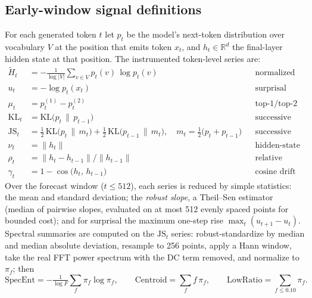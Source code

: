 
\subsection{Early-window signal definitions}\label{app:signals}

For each generated token $t$ let $p_t$ be the model's next-token
distribution over vocabulary $V$ at the position that emits token $x_t$,
and $h_t \in \mathbb{R}^d$ the final-layer hidden state at that position.
The instrumented token-level series are:
\begin{align*}
\tilde H_t &= -\frac{1}{\log \lvert V\rvert} \sum_{v \in V} p_t(v)\, \log p_t(v)
  && \text{normalized entropy}\\[3pt]
u_t &= -\log p_t(x_t)
  && \text{surprisal}\\[3pt]
\mu_t &= p_t^{(1)} - p_t^{(2)}
  && \text{top-1/top-2 probability margin}\\[3pt]
\mathrm{KL}_t &= \mathrm{KL}\bigl(p_t \,\big\|\, p_{t-1}\bigr)
  && \text{successive KL divergence}\\[3pt]
\mathrm{JS}_t &= \tfrac{1}{2}\,\mathrm{KL}\bigl(p_t \,\big\|\, m_t\bigr)
  + \tfrac{1}{2}\,\mathrm{KL}\bigl(p_{t-1} \,\big\|\, m_t\bigr),
  \quad m_t = \tfrac{1}{2}\bigl(p_t + p_{t-1}\bigr)
  && \text{successive JS divergence}\\[3pt]
\nu_t &= \lVert h_t \rVert
  && \text{hidden-state norm}\\[3pt]
\rho_t &= \lVert h_t - h_{t-1} \rVert \big/ \lVert h_{t-1} \rVert
  && \text{relative hidden step}\\[3pt]
\gamma_t &= 1 - \cos\bigl(h_t,\, h_{t-1}\bigr)
  && \text{cosine drift}
\end{align*}
Over the forecast window ($t \le 512$), each series is reduced by simple
statistics: the mean and standard deviation; the \emph{robust slope}, a
Theil--Sen estimator (median of pairwise slopes, evaluated on at most 512
evenly spaced points for bounded cost); and for surprisal the maximum
one-step rise $\max_t (u_{t+1} - u_t)$. Spectral summaries are computed on
the $\mathrm{JS}_t$ series: robust-standardize by median and median
absolute deviation, resample to 256 points, apply a Hann window, take the
real FFT power spectrum with the DC term removed, and normalize to
$\pi_f$; then
\[
\mathrm{SpecEnt} = -\tfrac{1}{\log F} \textstyle\sum_f \pi_f \log \pi_f,
\qquad
\mathrm{Centroid} = \textstyle\sum_f f\, \pi_f,
\qquad
\mathrm{LowRatio} = \textstyle\sum_{f \le 0.10} \pi_f .
\]
